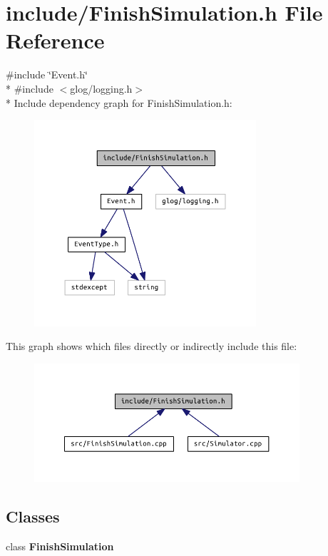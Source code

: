 \section{include/\+Finish\+Simulation.h File Reference}
\label{_finish_simulation_8h}
{\ttfamily \#include \char`\"{}Event.\+h\char`\"{}}\\*
{\ttfamily \#include $<$glog/logging.\+h$>$}\\*
Include dependency graph for Finish\+Simulation.\+h\+:
\nopagebreak
\begin{figure}[H]
\begin{center}
\leavevmode
\includegraphics[width=233pt]{_finish_simulation_8h__incl}
\end{center}
\end{figure}
This graph shows which files directly or indirectly include this file\+:
\nopagebreak
\begin{figure}[H]
\begin{center}
\leavevmode
\includegraphics[width=279pt]{_finish_simulation_8h__dep__incl}
\end{center}
\end{figure}
\subsection*{Classes}
\begin{DoxyCompactItemize}
\item 
class {\bf Finish\+Simulation}
\end{DoxyCompactItemize}
